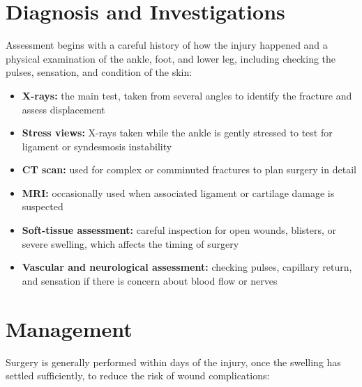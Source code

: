 \section*{Diagnosis and Investigations}
Assessment begins with a careful history of how the injury happened and a physical examination of the ankle, foot, and lower leg, including checking the pulses, sensation, and condition of the skin:

\begin{itemize}
    \item \textbf{X-rays:} the main test, taken from several angles to identify the fracture and assess displacement
    \item \textbf{Stress views:} X-rays taken while the ankle is gently stressed to test for ligament or syndesmosis instability
    \item \textbf{CT scan:} used for complex or comminuted fractures to plan surgery in detail
    \item \textbf{MRI:} occasionally used when associated ligament or cartilage damage is suspected
    \item \textbf{Soft-tissue assessment:} careful inspection for open wounds, blisters, or severe swelling, which affects the timing of surgery
    \item \textbf{Vascular and neurological assessment:} checking pulses, capillary return, and sensation if there is concern about blood flow or nerves
\end{itemize}

\section*{Management}
Surgery is generally performed within days of the injury, once the swelling has settled sufficiently, to reduce the risk of wound complications:

